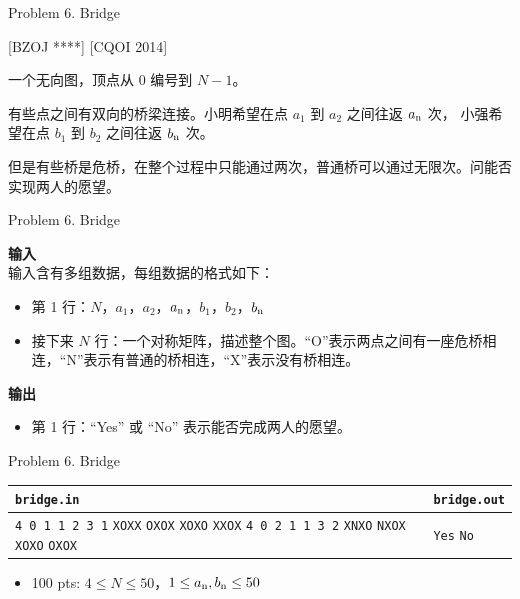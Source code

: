 \documentclass[UTF8]{beamer}
\begin{document}

\begin{frame}{Problem 6. Bridge}

[BZOJ ****] [CQOI 2014]

一个无向图，顶点从 0 编号到 $N - 1$。

有些点之间有双向的桥梁连接。小明希望在点 $a_1$ 到 $a_2$ 之间往返 $a_{\rm n}$ 次，
小强希望在点 $b_1$ 到 $b_2$ 之间往返 $b_{\rm n}$ 次。

但是有些桥是危桥，在整个过程中只能通过两次，普通桥可以通过无限次。问能否实现两人的愿望。

\end{frame}

\begin{frame}{Problem 6. Bridge}

\textbf{输入} \\
输入含有多组数据，每组数据的格式如下：
\begin{itemize}
    \item 第 1 行：$N$，$a_1$，$a_2$，$a_{\rm n}$，$b_1$，$b_2$，$b_{\rm n}$
    \item 接下来 $N$ 行：一个对称矩阵，描述整个图。“O”表示两点之间有一座危桥相连，“N”表示有普通的桥相连，“X”表示没有桥相连。
\end{itemize}
\textbf{输出}
\begin{itemize}
    \item 第 1 行：“Yes” 或 “No” 表示能否完成两人的愿望。
\end{itemize}

\end{frame}

\begin{frame}{Problem 6. Bridge}

\begin{tabularx}{\textwidth}{|X|X|}
\hline
\texttt{\textbf{bridge.in}} & \texttt{\textbf{bridge.out}} \\ \hline
\texttt{4 0 1 1 2 3 1}\newline
\texttt{XOXX}\newline
\texttt{OXOX}\newline
\texttt{XOXO}\newline
\texttt{XXOX}\newline
\texttt{4 0 2 1 1 3 2}\newline
\texttt{XNXO}\newline
\texttt{NXOX}\newline
\texttt{XOXO}\newline
\texttt{OXOX}
&
\texttt{Yes}\newline
\texttt{No}
\\ \hline
\end{tabularx}
\newline
\begin{itemize}
    \item 100 pts: $4 \leq N \leq 50$，$1 \leq a_{\rm n}, b_{\rm n} \leq 50$
\end{itemize}

\end{frame}
\end{document}
